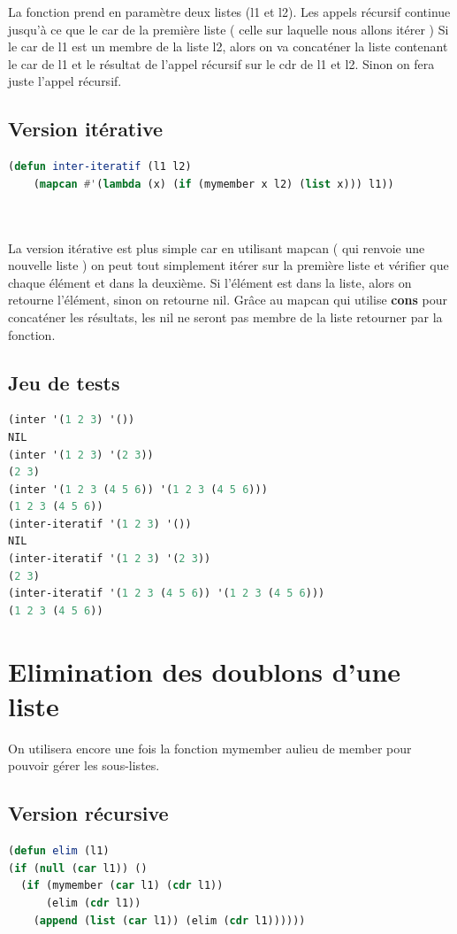 \documentclass[a4paper,10pt]{report}
\begin{document}
      La fonction prend en paramètre deux listes (l1 et l2). Les appels récursif continue jusqu'à ce que le car de la première liste ( celle sur laquelle nous allons itérer )
      Si le car de l1 est un membre de la liste l2, alors on va concaténer la liste contenant le car de l1 et le résultat de l'appel récursif sur le cdr de l1 et l2. Sinon
      on fera juste l'appel récursif. \newline
      
      
      \subsection{Version itérative}
      
	\begin{lstlisting}[language=Lisp]
(defun inter-iteratif (l1 l2)
    (mapcan #'(lambda (x) (if (mymember x l2) (list x))) l1))

    
    \end{lstlisting}

      La version itérative est plus simple car en utilisant mapcan ( qui renvoie une nouvelle liste ) on peut tout simplement itérer sur la première liste et vérifier que chaque élément et dans la deuxième.
      Si l'élément est dans la liste, alors on retourne l'élément, sinon on retourne nil. Grâce au mapcan qui utilise \textbf{cons} pour concaténer les résultats, les nil ne seront pas membre de la liste retourner par la fonction.
      \vspace{1cm}
	  \subsection{Jeu de tests}
	   \begin{lstlisting}[language=Lisp]
(inter '(1 2 3) '())
NIL	      
(inter '(1 2 3) '(2 3))
(2 3)	   
(inter '(1 2 3 (4 5 6)) '(1 2 3 (4 5 6)))
(1 2 3 (4 5 6))
(inter-iteratif '(1 2 3) '())
NIL	      
(inter-iteratif '(1 2 3) '(2 3))
(2 3)	   
(inter-iteratif '(1 2 3 (4 5 6)) '(1 2 3 (4 5 6)))
(1 2 3 (4 5 6))
		 \end{lstlisting}

      \section{Elimination des doublons d'une liste}
      On utilisera encore une fois la fonction mymember aulieu de member pour pouvoir gérer les sous-listes.
      \subsection{Version récursive}
	\begin{lstlisting}[language=Lisp]
(defun elim (l1)
(if (null (car l1)) ()
  (if (mymember (car l1) (cdr l1))
      (elim (cdr l1))
    (append (list (car l1)) (elim (cdr l1))))))
	
	
	\end{lstlisting}
      
\end{document}
